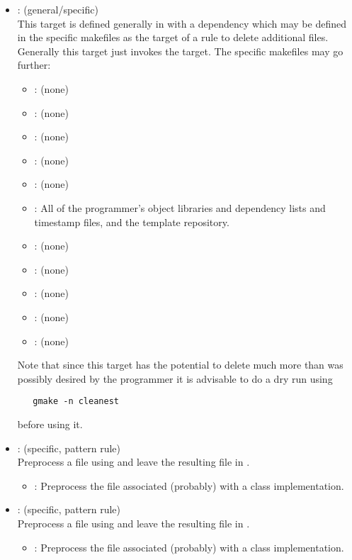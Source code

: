 \begin{itemize}
\item
    : (general/specific)
   \\ This target is defined generally in  with a dependency
   which may be defined in the specific makefiles as the target of a rule to
   delete additional files.  Generally this target just invokes the
    target.  The specific makefiles may go further:
   \begin{itemize}
   \item
      : (none)
   \item
      : (none)
   \item
      : (none)
   \item
      : (none)
   \item
      : (none)
   \item
      : All of the programmer's object libraries and dependency
      lists and timestamp files, and the template repository.
   \item
      : (none)
   \item
      : (none)
   \item
      : (none)
   \item
      : (none)
   \item
      : (none)
   \end{itemize}

   \noindent
   Note that since this target has the potential to delete much more than
   was possibly desired by the programmer it is advisable to do a dry run
   using

\begin{verbatim}
   gmake -n cleanest
\end{verbatim}

   \noindent
   before using it.

\item
    : (specific, pattern rule)
   \\ Preprocess a  file using  and leave the resulting
    file in .
   \begin{itemize}
   \item
      : Preprocess the  file associated (probably) with a
      class implementation.
   \end{itemize}

\item
    : (specific, pattern rule)
   \\ Preprocess a  file using  and leave the
   resulting  file in .
   \begin{itemize}
   \item
      : Preprocess the  file associated (probably) with a
      class implementation.
   \end{itemize}


\end{itemize}
